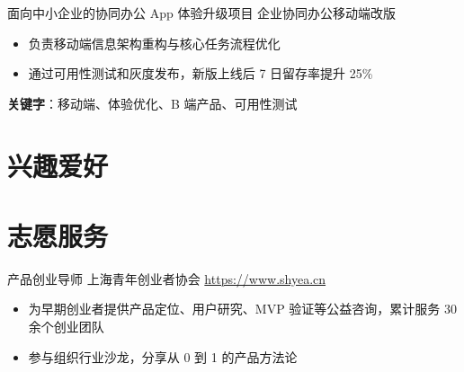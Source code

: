\documentclass[a4paper, serif, 10pt]{moderncv}
\begin{document}
        {面向中小企业的协同办公 App 体验升级项目}
        {企业协同办公移动端改版}
        {}
        {}
        {\begin{itemize}
\item 负责移动端信息架构重构与核心任务流程优化
\item 通过可用性测试和灰度发布，新版上线后 7 日留存率提升 25\%
\end{itemize}
\textbf{关键字}：移动端、体验优化、B 端产品、可用性测试}
\section{兴趣爱好}

\section{志愿服务}

        {产品创业导师}
        {上海青年创业者协会}
        {\url{https://www.shyea.cn}}
        {}
        {\begin{itemize}
\item 为早期创业者提供产品定位、用户研究、MVP 验证等公益咨询，累计服务 30 余个创业团队
\item 参与组织行业沙龙，分享从 0 到 1 的产品方法论
\end{itemize}}
    
\end{document}
